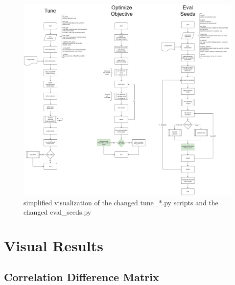 \begin{landscape}
	\begin{figure}
		\centering
		\includegraphics[height=\textheight,width=\linewidth,keepaspectratio]{images/tune_eval_seeds-CHANGED.png}
		\caption[Tuning Script Changes]{simplified visualization of the changed tune\_*.py scripts and the changed eval\_seeds.py}
	\end{figure}
\end{landscape}





\section{Visual Results}
\label{A:Visual_results}
\subsection[]{Correlation Difference Matrix}
\label{A:corr_matrix}

